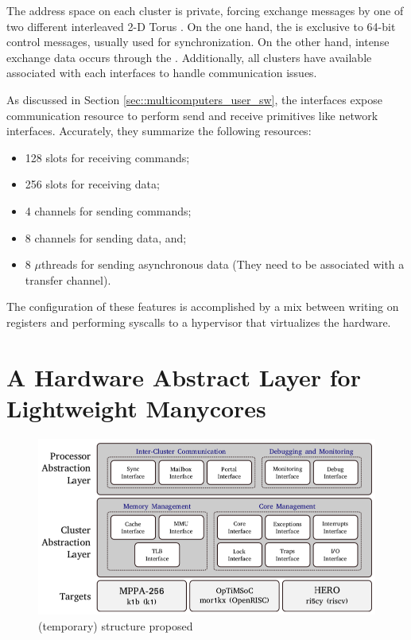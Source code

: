 			The address space on each cluster is private, forcing exchange messages
			by one of two different interleaved 2-D Torus \nocs.
			On the one hand, the \cnoc is exclusive to 64-bit control messages,
			usually used for synchronization.
			On the other hand, intense exchange data occurs through the \dnoc.
			Additionally, all clusters have available \dmas associated with each
			\noc interfaces to handle communication issues.

			As discussed in Section \ref{sec::multicomputers_user_sw}, the \noc interfaces
			expose communication resource to perform send and receive primitives
			like network interfaces.
			Accurately, they summarize the following resources:

			\begin{itemize}
				\item 128 slots for receiving commands;
				\item 256 slots for receiving data;
				\item 4 channels for sending commands;
				\item 8 channels for sending data, and;
				\item 8 $\mu$threads for sending asynchronous data
					(They need to be associated with a transfer channel).
			\end{itemize}

			The configuration of these features is accomplished by a mix between
			writing on \dma registers and performing syscalls to a hypervisor
			that virtualizes the \mppa hardware.	
	
\section{A Hardware Abstract Layer for Lightweight Manycores}
\label{sec::hal}

	\begin{figure}[h]
		\centering
		\includegraphics[width=.9\textwidth]{images/hal-struct.png}

		\caption{
			(temporary) \hal structure proposed
		}\par
		\label{fig::hal_struct}
	\end{figure}
	
